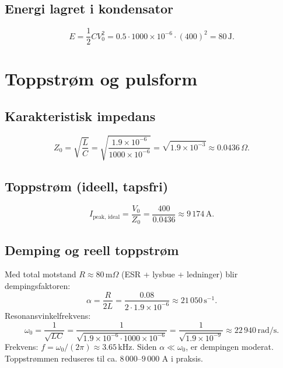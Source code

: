 \documentclass{article}
\begin{document}
\subsection{Energi lagret i kondensator}
\begin{equation}
E = \frac{1}{2} C V_0^2 = 0.5 \cdot 1000 \times 10^{-6} \cdot (400)^2 = 80\,\text{J}.
\end{equation}

\section{Toppstrøm og pulsform}

\subsection{Karakteristisk impedans}
\begin{equation}
Z_0 = \sqrt{\frac{L}{C}} = \sqrt{\frac{1.9 \times 10^{-6}}{1000 \times 10^{-6}}} = \sqrt{1.9 \times 10^{-3}} \approx 0.0436\,\Omega.
\end{equation}

\subsection{Toppstrøm (ideell, tapsfri)}
\begin{equation}
I_{\text{peak, ideal}} = \frac{V_0}{Z_0} = \frac{400}{0.0436} \approx 9\,174\,\text{A}.
\end{equation}

\subsection{Demping og reell toppstrøm}
Med total motstand $R \approx 80\,\text{m}\Omega$ (ESR + lysbue + ledninger) blir dempingsfaktoren:
\begin{equation}
\alpha = \frac{R}{2L} = \frac{0.08}{2 \cdot 1.9 \times 10^{-6}} \approx 21\,050\,\text{s}^{-1}.
\end{equation}
Resonansvinkelfrekvens:
\begin{equation}
\omega_0 = \frac{1}{\sqrt{LC}} = \frac{1}{\sqrt{1.9 \times 10^{-6} \cdot 1000 \times 10^{-6}}} = \frac{1}{\sqrt{1.9 \times 10^{-9}}} \approx 22\,940\,\text{rad/s}.
\end{equation}
Frekvens: $f = \omega_0/(2\pi) \approx 3.65\,\text{kHz}$.
Siden $\alpha \ll \omega_0$, er dempingen moderat. Toppstrømmen reduseres til ca. $8\,000$--$9\,000$ A i praksis.
\end{document}
